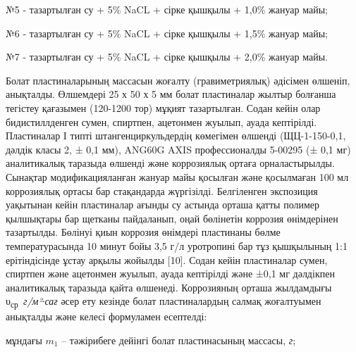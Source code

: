 №5 - тазартылған су + 5\% NaCL + сірке қышқылы + 1,0\% жануар майы;

№6 - тазартылған су + 5\% NaCL + сірке қышқылы + 1,5\% жануар майы;

№7 - тазартылған су + 5\% NaCL + сірке қышқылы + 2,0\% жануар майы.

Болат пластиналарының массасын жоғалту (гравиметриялық) әдісімен
өлшеніп, анықталды. Өлшемдері 25 х 50 х 5 мм болат пластиналар жылтыр
болғанша тегістеу қағазымен (120-1200 тор) мұқият тазартылған. Содан
кейін олар бидистиллденген сумен, спиртпен, ацетонмен жуылып, ауада
кептірілді. Пластиналар I типті штангенциркульдердің көмегімен өлшенді
(ЩЦ-1-150-0,1, дәлдік класы 2, ± 0,1 мм), ANG60G AXIS профессионалды
5-00295 (± 0,1 мг) аналитикалық таразыда өлшенді және коррозиялық ортаға
орналастырылды. Сынақтар модификацияланған жануар майы қосылған және
қосылмаған 100 мл коррозиялық ортасы бар стақандарда жүргізілді.
Белгіленген экспозиция уақытынан кейін пластиналар ағынды су астында
орташа қатты полимер қылшықтары бар щетканы пайдаланып, оңай бөлінетін
коррозия өнімдерінен тазартылды. Бөлінуі қиын коррозия өнімдері
пластинаны бөлме температурасында 10 минут бойы 3,5 г/л уротропині бар
тұз қышқылының 1:1 ерітіндісінде ұстау арқылы жойылды {[}10{]}. Содан
кейін пластиналар сумен, спиртпен және ацетонмен жуылып, ауада
кептірілді және ±0,1 мг дәлдікпен аналитикалық таразыда қайта өлшенеді.
Коррозияның орташа жылдамдығы υ\textsubscript{ср}~\emph{г/м²∙сағ} әсер
ету кезінде болат пластиналардың салмақ жоғалтуымен анықталды және
келесі формуламен есептелді:


мұндағы \(m_{1}\) -- тәжірибеге дейінгі болат пластинасының массасы,
\emph{г};

